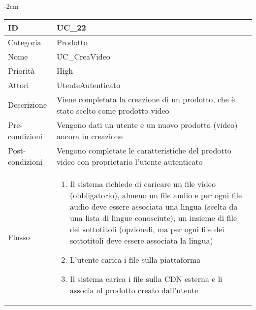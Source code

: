 \begin{center}
\begin{table}[bp]
    \centering
    \addtolength{\leftskip} {-2cm}
\begin{tabular}{ |p{2.6cm}|p{13cm}|  }
\hline
ID & UC\_22\\\hline
Categoria & Prodotto \\\hline
Nome & UC\_CreaVideo \\\hline
Priorità & High \\\hline
Attori &  UtenteAutenticato \\\hline
Descrizione & Viene completata la creazione di un prodotto, che è stato scelto come prodotto video\\\hline
Pre-condizioni &   Vengono dati un utente e un nuovo prodotto (video) ancora in creazione\\\hline
Post-condizioni &  Vengono completate le caratteristiche del prodotto video con proprietario l'utente autenticato\\\hline
Flusso &  	\vspace{-5mm} \begin{enumerate}
			\item Il sistema richiede di caricare un file video (obbligatorio), almeno un file audio e per ogni file audio deve essere associata una lingua (scelta da una lista di lingue conosciute), un insieme di file dei sottotitoli (opzionali, ma per ogni file dei sottotitoli deve essere associata la lingua)
			\item L'utente carica i file sulla piattaforma
			\item Il sistema carica i file sulla CDN esterna e li associa al prodotto creato dall'utente
		\end{enumerate}\\\hline
\end{tabular}
\label{table_use_case:22}\newline
\end{table}


\end{center}
